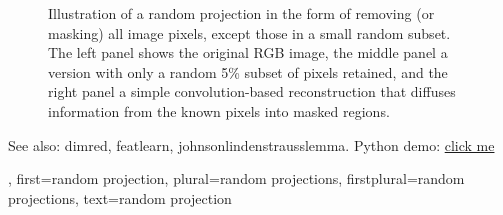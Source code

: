 {{\begin{figure}[H]
				\caption{Illustration of a random projection in the form of removing (or masking) 
				 	all image pixels, except those in a small random subset. 
				 	The left panel shows the original RGB image, the middle panel a version 
				 	with only a random 5\% subset of pixels retained, and the right panel a 
				 	simple convolution-based reconstruction that diffuses information from 
				 	the known pixels into masked regions.}
				 	\label{fig:randomprojection_dict}
				 \end{figure}
				 See also: \gls{dimred}, \gls{featlearn}, \gls{johnsonlindenstrausslemma}.
		Python demo: \href{https://github.com/AaltoDictionaryofML/AaltoDictionaryofML.github.io/blob/main/assets/pythonsnacks/randomprojection/randomprojection.py}{click me}},
			first={random projection},
			plural={random projections}, 
			firstplural={random projections}, 
			text={random projection}
}

